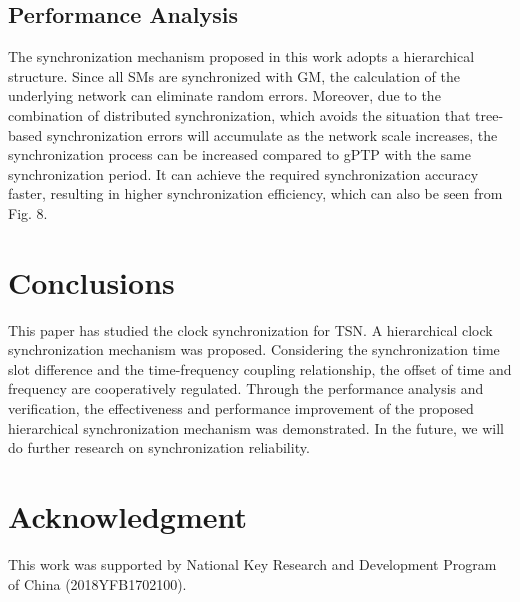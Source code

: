 \documentclass[conference]{IEEEtran}
\begin{document}
	
	\subsection{Performance Analysis}
	The synchronization mechanism proposed in this work adopts a hierarchical structure. Since all SMs are synchronized with GM, the calculation of the underlying network can eliminate random errors. Moreover, due to the combination of distributed synchronization, which avoids the situation that tree-based synchronization errors will accumulate as the network scale increases, the synchronization process can be increased compared to gPTP with the same synchronization period. It can achieve the required synchronization accuracy faster, resulting in higher synchronization efficiency, which can also be seen from Fig. 8. 
	
	
	\section{Conclusions}
	This paper has studied the clock synchronization for TSN. A hierarchical clock synchronization mechanism was proposed. Considering the synchronization time slot difference and the time-frequency coupling relationship, the offset of time and frequency are cooperatively regulated. Through the performance analysis and verification, the effectiveness and performance improvement of the proposed hierarchical synchronization mechanism was demonstrated. In the future, we will do further research on synchronization reliability.
	
	\section*{Acknowledgment}
	This work was supported  by National Key Research and Development Program of China (2018YFB1702100).
	
\end{document}
